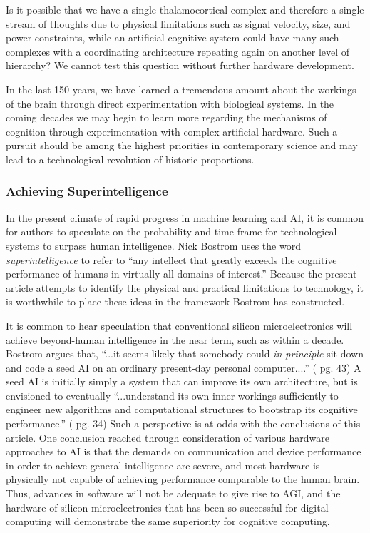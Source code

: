 \vspace{3em}
Is it possible that we have a single thalamocortical complex and therefore a single stream of thoughts due to physical limitations such as signal velocity, size, and power constraints, while an artificial cognitive system could have many such complexes with a coordinating architecture repeating again on another level of hierarchy? We cannot test this question without further hardware development.

\vspace{3em}
In the last 150 years, we have learned a tremendous amount about the workings of the brain through direct experimentation with biological systems. In the coming decades we may begin to learn more regarding the mechanisms of cognition through experimentation with complex artificial hardware. Such a pursuit should be among the highest priorities in contemporary science and may lead to a technological revolution of historic proportions.

\subsubsection{Achieving Superintelligence}
In the present climate of rapid progress in machine learning and AI, it is common for authors to speculate on the probability and time frame for technological systems to surpass human intelligence. Nick Bostrom uses the word \textit{superintelligence} to refer to ``any intellect that greatly exceeds the cognitive performance of humans in virtually all domains of interest.'' \cite{bo2014} Because the present article attempts to identify the physical and practical limitations to technology, it is worthwhile to place these ideas in the framework Bostrom has constructed.  

It is common to hear speculation that conventional silicon microelectronics will achieve beyond-human intelligence in the near term, such as within a decade. Bostrom argues that, ``...it seems likely that somebody could \textit{in principle} sit down and code a seed AI on an ordinary present-day personal computer....'' (\cite{bo2014} pg. 43) A seed AI is initially simply a system that can improve its own architecture, but is envisioned to eventually ``...understand its own inner workings sufficiently to engineer new algorithms and computational structures to bootstrap its cognitive performance.'' (\cite{bo2014} pg. 34) Such a perspective is at odds with the conclusions of this article. One conclusion reached through consideration of various hardware approaches to AI is that the demands on communication and device performance in order to achieve general intelligence are severe, and most hardware is physically not capable of achieving performance comparable to the human brain. Thus, advances in software will not be adequate to give rise to AGI, and the hardware of silicon microelectronics that has been so successful for digital computing will demonstrate the same superiority for cognitive computing.

